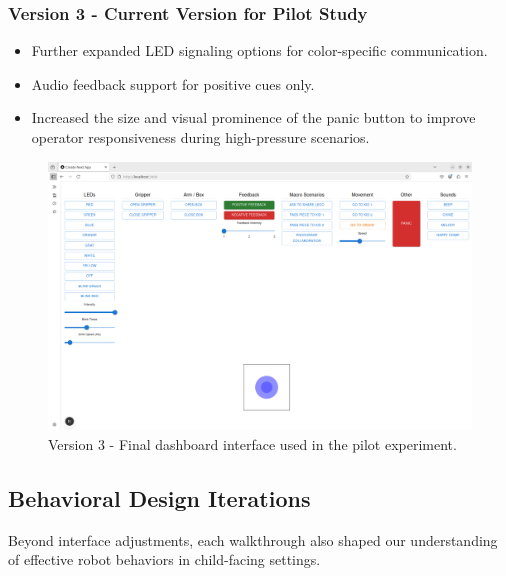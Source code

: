 \documentclass[a4paper]{usiinfbachelorproject}
\begin{document}
\subsubsection*{\textbf{Version 3 - Current Version for Pilot Study}}
\begin{itemize}
    \item Further expanded LED signaling options for color-specific communication.
    \item Audio feedback support for positive cues only.
    \item Increased the size and visual prominence of the panic button to improve operator responsiveness during high-pressure scenarios.
\end{itemize}
\begin{figure}[H]
    \centering
    \includegraphics[width=0.8\linewidth]{figures/dashboard_v3.png}
    \caption{Version 3 - Final dashboard interface used in the pilot experiment.}
    \label{fig:dashboard-v3}
\end{figure}

\subsection{\textbf{Behavioral Design Iterations}}

Beyond interface adjustments, each walkthrough also shaped our understanding of effective robot behaviors in child-facing settings.
\end{document}
